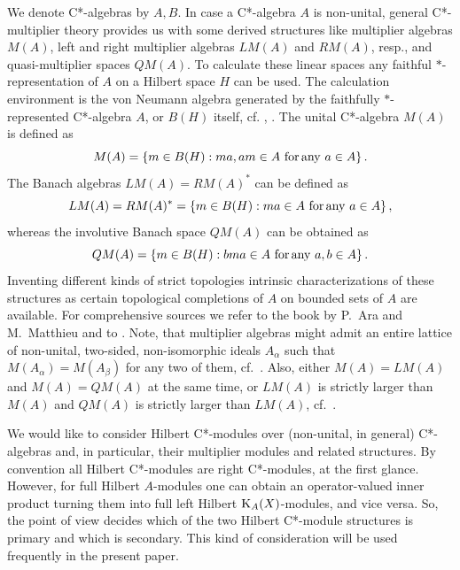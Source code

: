 \documentclass{amsart}
\theoremstyle{definition}
\begin{document}
We denote C*-algebras by $A,B$. In case a C*-algebra $A$ is non-unital, general C*-multiplier theory provides us with some derived structures like multiplier algebras $M(A)$, left and right multiplier algebras $LM(A)$ and $RM(A)$, resp., and quasi-multiplier spaces $QM(A)$. To calculate these linear spaces any faithful $*$-representation of $A$ on a Hilbert space $H$ can be used. The calculation environment is the von Neumann algebra generated by the faithfully $*$-represented C*-algebra $A$, or $B(H)$ itself, cf. \cite[Ch.~3]{Murphy}, \cite{Pedersen_1984}. The unital C*-algebra $M(A)$ is defined as 
\[
   M(A) = \{ m \in B(H): ma, am \in A \,\, {\rm for} \, {\rm any} \,\, a \in A \} \, .
\]
The Banach algebras $LM(A)=RM(A)^*$ can be defined as
\[
   LM(A) = RM(A)^* =  \{ m \in B(H): ma  \in A \,\, {\rm for} \, {\rm any} \,\, a \in A \} \, ,
\]
whereas the involutive Banach space $QM(A)$ can be obtained as
\[
   QM(A) = \{ m \in B(H): bma  \in A \,\, {\rm for} \, {\rm any} \,\, a,b \in A \} \, .
\]
Inventing different kinds of strict topologies intrinsic characterizations of these structures as certain topological completions of $A$ on bounded sets of $A$ are available. For comprehensive sources we refer to the book by  P.~Ara and M.~Matthieu \cite{AM_2003} and to \cite{Lin_1989,Lin_1991,BMSh_1994,F_1999_1}. Note, that multiplier algebras might admit an entire lattice of non-unital, two-sided, non-isomorphic ideals $A_\alpha$ such that $M(A_\alpha) = M(A_\beta)$ for any two of them, cf.~\cite{HW_2012}. Also, either $M(A)=LM(A)$ and $M(A)=QM(A)$ at the same time, or $LM(A)$ is strictly larger than $M(A)$ and $QM(A)$ is strictly larger than $LM(A)$, cf.~\cite[Cor.~4.18]{Brown}. 

We would like to consider Hilbert C*-modules over (non-unital, in general) C*-algebras and, in particular, their multiplier modules and related structures. By convention all Hilbert C*-modules are right C*-modules, at the first glance. However, for full Hilbert $A$-modules one can obtain an operator-valued inner product turning them into full left Hilbert ${\rm K}_A(X)$-modules, and vice versa. So, the point of view decides which of the two Hilbert C*-module structures is primary and which is secondary. This kind of consideration will be used frequently in the present paper.
\end{document}
